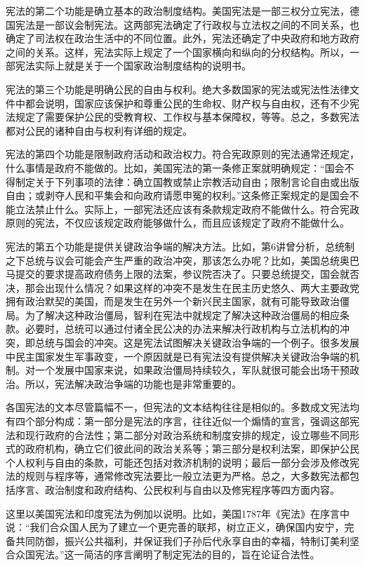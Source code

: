宪法的第二个功能是确立基本的政治制度结构。美国宪法是一部三权分立宪法，德国宪法是一部议会制宪法。这两部宪法确定了行政权与立法权之间的不同关系，也确定了司法权在政治生活中的不同位置。此外，宪法还确定了中央政府和地方政府之间的关系。这样，宪法实际上规定了一个国家横向和纵向的分权结构。所以，一部宪法实际上就是关于一个国家政治制度结构的说明书。

宪法的第三个功能是明确公民的自由与权利。绝大多数国家的宪法或宪法性法律文件中都会说明，国家应该保护和尊重公民的生命权、财产权与自由权，还有不少宪法规定了需要保护公民的受教育权、工作权与基本保障权，等等。总之，多数宪法都对公民的诸种自由与权利有详细的规定。

宪法的第四个功能是限制政府活动和政治权力。符合宪政原则的宪法通常还规定，什么事情是政府不能做的。比如，美国宪法的第一条修正案就明确规定：“国会不得制定关于下列事项的法律：确立国教或禁止宗教活动自由；限制言论自由或出版自由；或剥夺人民和平集会和向政府请愿申冤的权利。”这条修正案规定的是国会不能立法禁止什么。实际上，一部宪法还应该有条款规定政府不能做什么。符合宪政原则的宪法，不仅应该规定政府能够做什么，而且应该规定了政府不能做什么。

宪法的第五个功能是提供关键政治争端的解决方法。比如，第6讲曾分析，总统制之下总统与议会可能会产生严重的政治冲突，那该怎么办呢？比如，美国总统奥巴马提交的要求提高政府债务上限的法案，参议院否决了。只要总统提交，国会就否决，那会出现什么情况？如果这样的冲突不是发生在民主历史悠久、两大主要政党拥有政治默契的美国，而是发生在另外一个新兴民主国家，就有可能导致政治僵局。为了解决这种政治僵局，智利在宪法中就规定了解决这种政治僵局的相应条款。必要时，总统可以通过付诸全民公决的办法来解决行政机构与立法机构的冲突，即总统与国会的冲突。这是宪法试图解决关键政治争端的一个例子。很多发展中民主国家发生军事政变，一个原因就是已有宪法没有提供解决关键政治争端的机制。对一个发展中国家来说，如果政治僵局持续较久，军队就很可能会出场干预政治。所以，宪法解决政治争端的功能也是非常重要的。

各国宪法的文本尽管篇幅不一，但宪法的文本结构往往是相似的。多数成文宪法均有四个部分构成：第一部分是宪法的序言，往往近似一个煽情的宣言，强调这部宪法和现行政府的合法性；第二部分对政治系统和制度安排的规定，设立哪些不同形式的政府机构，确立它们彼此间的政治关系等；第三部分是权利法案，即保护公民个人权利与自由的条款，可能还包括对救济机制的说明；最后一部分会涉及修改宪法的规则与程序等，通常修改宪法要比一般立法更为严格。总之，大多数宪法都包括序言、政治制度和政府结构、公民权利与自由以及修宪程序等四方面内容。

这里以美国宪法和印度宪法为例加以说明。比如，美国1787年《宪法》在序言中说：“我们合众国人民为了建立一个更完善的联邦，树立正义，确保国内安宁，完备共同防御，振兴公共福利，并保证我们子孙后代永享自由的幸福，特制订美利坚合众国宪法。”这一简洁的序言阐明了制定宪法的目的，旨在论证合法性。


